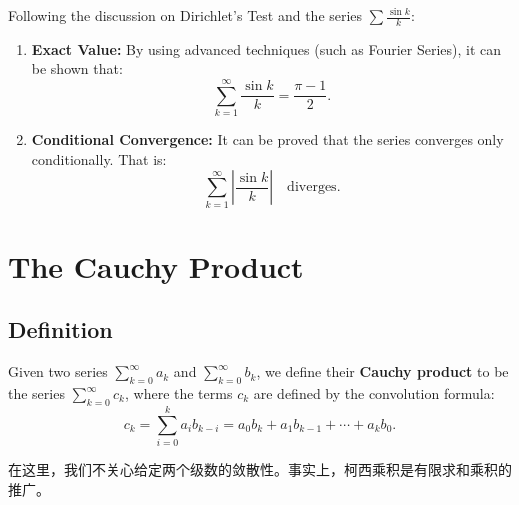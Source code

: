 \documentclass[
	UTF-8,
	11pt, %
	a4paper, %
]{LegrandOrangeBook}
\begin{document}
    

    Following the discussion on Dirichlet's Test and the series $\sum \frac{\sin k}{k}$:

    \begin{remark}
    \begin{enumerate}
        \item \textbf{Exact Value:} By using advanced techniques (such as Fourier Series), it can be shown that:
        \[ \sum_{k=1}^{\infty} \frac{\sin k}{k} = \frac{\pi - 1}{2}. \]
        
        \item \textbf{Conditional Convergence:} It can be proved that the series converges only conditionally. That is:
        \[ \sum_{k=1}^{\infty} \left| \frac{\sin k}{k} \right| \quad \text{diverges}. \]
    \end{enumerate}
    \end{remark}
    
    \newpage

    \section{The Cauchy Product}

    \subsection{Definition}

    \begin{definition}
    Given two series $\sum_{k=0}^{\infty} a_k$ and $\sum_{k=0}^{\infty} b_k$, we define their \textbf{Cauchy product} to be the series $\sum_{k=0}^{\infty} c_k$, where the terms $c_k$ are defined by the convolution formula:
    \[ c_k = \sum_{i=0}^{k} a_i b_{k-i} = a_0 b_k + a_1 b_{k-1} + \cdots + a_k b_0. \]
    \end{definition}

    \begin{remark}
        在这里，我们不关心给定两个级数的敛散性。事实上，柯西乘积是有限求和乘积的推广。
    \end{remark}
\end{document}
